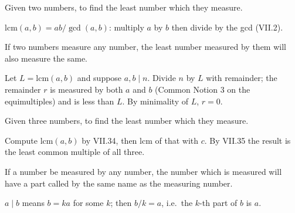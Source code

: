 \begin{claim}
\label{prop:VII.34}
Given two numbers, to find the least number which they measure.
\end{claim}
\begin{evidence}
\label{ev:VII.34}
$\mathrm{lcm}(a, b) = ab / \gcd(a, b)$: multiply $a$ by $b$ then
divide by the gcd (VII.2).
\end{evidence}

\begin{claim}
\label{prop:VII.35}
If two numbers measure any number, the least number measured by them
will also measure the same.
\end{claim}
\begin{evidence}
\label{ev:VII.35}
Let $L = \mathrm{lcm}(a, b)$ and suppose $a, b \mid n$.  Divide $n$
by $L$ with remainder; the remainder $r$ is measured by both $a$ and
$b$ (Common Notion 3 on the equimultiples) and is less than $L$.  By
minimality of $L$, $r = 0$.
\end{evidence}

\begin{claim}
\label{prop:VII.36}
Given three numbers, to find the least number which they measure.
\end{claim}
\begin{evidence}
\label{ev:VII.36}
Compute $\mathrm{lcm}(a, b)$ by VII.34, then $\mathrm{lcm}$ of that
with $c$.  By VII.35 the result is the least common multiple of all
three.
\end{evidence}

\begin{claim}
\label{prop:VII.37}
If a number be measured by any number, the number which is measured
will have a part called by the same name as the measuring number.
\end{claim}
\begin{evidence}
\label{ev:VII.37}
$a \mid b$ means $b = ka$ for some $k$; then $b / k = a$, i.e.\ the
$k$-th part of $b$ is $a$.
\end{evidence}

